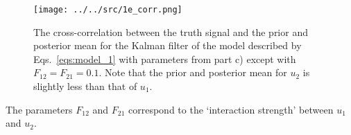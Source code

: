 \begin{enumerate}[a)]
	\begin{figure}[H]
		\centering
		\texttt{[image: ../../src/1e\_corr.png]}
		\caption{The cross-correlation between the truth signal and the prior and posterior mean for the Kalman filter of the model described by Eqs.~\ref{eqs:model_1} with parameters from part c) except with $F_{12} = F_{21} = 0.1$. Note that the prior and posterior mean for $u_2$ is slightly less than that of $u_1$.}
		\label{fig:1e_corr}
	\end{figure}
	
	The parameters $F_{12}$ and $F_{21}$ correspond to the `interaction strength' between $u_1$ and $u_2$.
	
\end{enumerate}
